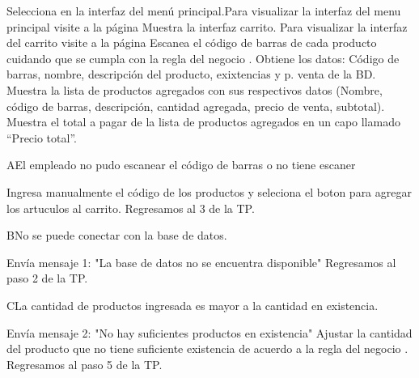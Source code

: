 
\begin{UCtrayectoria}
		
	\UCpaso [\UCactor]Selecciona  en la interfaz del menú principal.Para visualizar la interfaz del menu principal visite a la página \pageref{UI: menu principal}
	\UCpaso [\UCsist]Muestra la interfaz carrito. Para visualizar la interfaz del carrito visite a la página \pageref{UI: carrito}
	\UCpaso [\UCactor]Escanea el código de barras de cada producto cuidando que se cumpla con la regla del negocio . 							
	\UCpaso [\UCsist]Obtiene los datos: Código de barras, nombre, descripción del producto, exixtencias y  p. venta de la BD. 
	\UCpaso [\UCsist]Muestra la lista de productos agregados con sus respectivos datos (Nombre, código de barras, descripción, cantidad agregada, precio de venta, subtotal). 
	\UCpaso [\UCsist]Muestra el total a pagar de la lista de productos agregados en un capo llamado “Precio total”.		

	
\end{UCtrayectoria}



\begin{UCtrayectoriaA}{A}{El empleado no pudo escanear el código de barras o no tiene escaner}

	\UCpaso [\UCactor] Ingresa manualmente el código de los productos y seleciona el boton  para agregar los artuculos al carrito.
	\UCpaso [\UCsist]Regresamos al 3 de la TP.
\end{UCtrayectoriaA}



\begin{UCtrayectoriaA}{B}{No se puede conectar con la base de datos.}

	\UCpaso [\UCsist]Envía mensaje 1: "La base de datos no se encuentra disponible"
 	\UCpaso [\UCsist]Regresamos al paso 2 de la TP.

 \end{UCtrayectoriaA}


\begin{UCtrayectoriaA}{C}{La cantidad de productos ingresada es mayor a la cantidad en existencia.}

	\UCpaso [\UCsist]Envía mensaje 2: "No hay suficientes productos en existencia"
	\UCpaso [\UCactor] Ajustar la cantidad del producto que no tiene suficiente existencia de acuerdo a la regla del negocio  .
	\UCpaso [\UCsist]Regresamos al paso 5 de la TP.

\end{UCtrayectoriaA}

